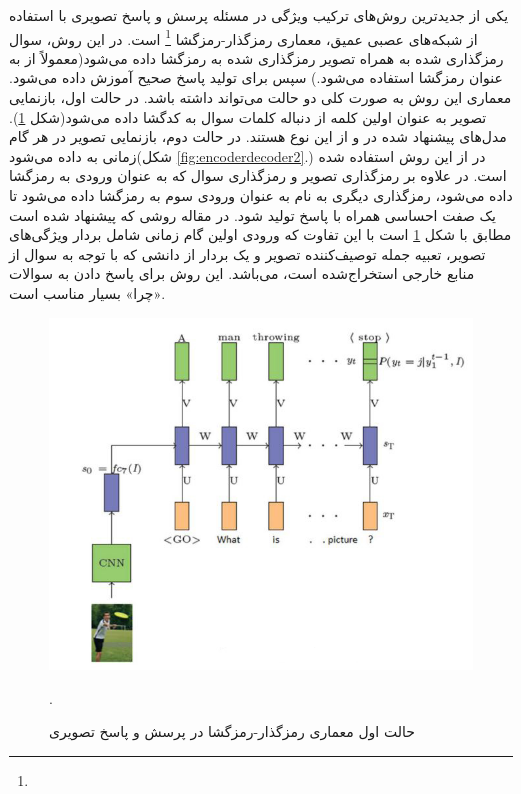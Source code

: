 یکی از جدیدترین‌ روش‌های ترکیب ویژگی در مسئله پرسش و پاسخ تصویری با استفاده از شبکه‌های عصبی عمیق، معماری رمزگذار-رمزگشا
\footnote{}
است. در این روش، سوال رمزگذاری شده به همراه تصویر رمزگذاری شده به رمزگشا داده می‌شود(معمولاً از 
به عنوان رمزگشا استفاده می‌شود.) سپس برای تولید پاسخ صحیح آموزش داده می‌شود. معماری این روش به صورت کلی دو حالت می‌تواند داشته باشد. در حالت اول، بازنمایی تصویر به عنوان اولین کلمه از دنباله کلمات سوال به کدگشا داده می‌شود(شکل 
\ref{fig:encoderdecoder1}).
مدل‌های پیشنهاد شده در 
\cite{ren2015image}
و
\cite{zhu2016visual7w}
از این نوع هستند.  در حالت دوم، بازنمایی تصویر در هر گام زمانی به 
داده می‌شود(شکل
\ref{fig:encoderdecoder2}.)
در 
\cite{malinowski2017ask}
از این روش استفاده شده است. در 
\cite{ruwa2018affective}
علاوه بر رمزگذاری تصویر و رمزگذاری سوال که به عنوان ورودی به رمزگشا داده‌‌ می‌شود، رمزگذاری دیگری به نام
به عنوان ورودی سوم به رمزگشا داده می‌شود تا یک صفت احساسی همراه با پاسخ تولید شود. در مقاله
\cite{wu2017image}
روشی که پیشنهاد شده است مطابق با شکل 
\ref{fig:encoderdecoder1}
است با این تفاوت که ورودی اولین گام زمانی 
شامل بردار ویژگی‌های تصویر، تعبیه جمله توصیف‌کننده تصویر و یک بردار از دانشی که با توجه به سوال از منابع خارجی استخراج‌شده است، می‌باشد. این روش برای پاسخ دادن به سوالات «چرا» بسیار مناسب است.
\begin{figure}
	\centerline{\includegraphics[scale=0.4]{images/encoder-decoder1.JPG}}
	\caption{حالت اول معماری رمزگذار-رمزگشا در پرسش و پاسخ تصویری}.
	\label{fig:encoderdecoder1}
\end{figure}

